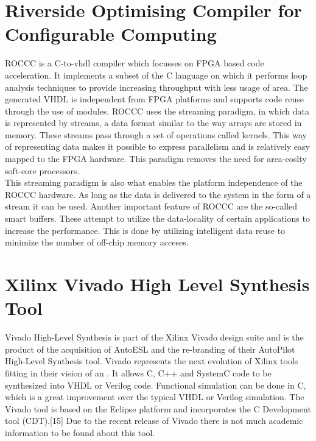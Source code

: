 \section{Riverside Optimising Compiler for Configurable Computing} 
ROCCC is a C-to-vhdl compiler which focusses on FPGA based code acceleration. It implements a subset of the C language on which it performs loop analysis techniques to provide increasing throughput with less usage of area\cite{martin_high-level_2009}. The generated VHDL is independent from FPGA platforms and supports code reuse through the use of modules. 
ROCCC uses the streaming paradigm, in which data is represented by streams, a data format similar to the way arrays are stored in memory. These streams pass through a set of operations called kernels. This way of representing data makes it possible to express parallelism and is relatively easy mapped to the FPGA hardware. This paradigm removes the need for area-coslty soft-core processors\cite{buyukkurt_impact_2006}.\\
This streaming paradigm is also what enables the platform independence of the ROCCC hardware. As long as the data is delivered to the system in the form of a stream it can be used.
Another important feature of ROCCC are the so-called smart buffers. These attempt to utilize the data-locality of certain applications to increase the performance. This is done by utilizing intelligent data reuse to minimize the number of off-chip memory acceses. 

\section{Xilinx Vivado High Level Synthesis Tool} 

Vivado High-Level Synthesis is part of the Xilinx Vivado design suite and is the product of the acquisition of AutoESL and the re-branding of their AutoPilot High-Level Synthesis tool. Vivado represents the next evolution of Xilinx tools fitting in their vision of an .  It allows C, C++ and SystemC code to be synthesized into VHDL or Verilog code. Functional simulation can be done in C, which is a great improvement over the typical VHDL or Verilog simulation. The Vivado tool is based on the Eclipse platform and incorporates the C Development tool (CDT).[15] Due to the recent release of Vivado there is not much academic information to be found about this tool.



